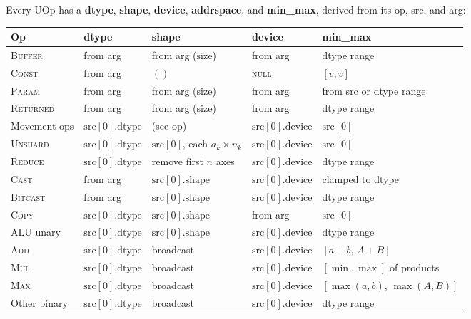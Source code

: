\documentclass[10pt,letterpaper]{article}
\newcommand{\op}[1]{\textsc{#1}}
\begin{document}
Every UOp has a \textbf{dtype}, \textbf{shape}, \textbf{device}, \textbf{addrspace}, and \textbf{min\_max}, derived from its op, src, and arg:

\medskip
\begin{tabular}{@{}l l l l l@{}}
\toprule
\textbf{Op} & \textbf{dtype} & \textbf{shape} & \textbf{device} & \textbf{min\_max} \\
\midrule
\op{Buffer} & from arg & from arg ($\mathrm{size}$) & from arg & dtype range \\
\op{Const} & from arg & $()$ & \textsc{null} & $[v, v]$ \\
\op{Param} & from arg & from arg ($\mathrm{size}$) & from arg & from src or dtype range \\
\op{Returned} & from arg & from arg ($\mathrm{size}$) & from arg & dtype range \\[3pt]
Movement ops & $\mathrm{src}[0].\mathrm{dtype}$ & (see op) & $\mathrm{src}[0].\mathrm{device}$ & $\mathrm{src}[0]$ \\
\op{Unshard} & $\mathrm{src}[0].\mathrm{dtype}$ & $\mathrm{src}[0]$, each $a_k \times n_k$ & $\mathrm{src}[0].\mathrm{device}$ & $\mathrm{src}[0]$ \\
\op{Reduce} & $\mathrm{src}[0].\mathrm{dtype}$ & remove first $n$ axes & $\mathrm{src}[0].\mathrm{device}$ & dtype range \\[3pt]
\op{Cast} & from arg & $\mathrm{src}[0].\mathrm{shape}$ & $\mathrm{src}[0].\mathrm{device}$ & clamped to dtype \\
\op{Bitcast} & from arg & $\mathrm{src}[0].\mathrm{shape}$ & $\mathrm{src}[0].\mathrm{device}$ & dtype range \\
\op{Copy} & $\mathrm{src}[0].\mathrm{dtype}$ & $\mathrm{src}[0].\mathrm{shape}$ & from arg & $\mathrm{src}[0]$ \\
ALU unary & $\mathrm{src}[0].\mathrm{dtype}$ & $\mathrm{src}[0].\mathrm{shape}$ & $\mathrm{src}[0].\mathrm{device}$ & dtype range \\
\op{Add} & $\mathrm{src}[0].\mathrm{dtype}$ & broadcast & $\mathrm{src}[0].\mathrm{device}$ & $[a+b,\, A+B]$ \\
\op{Mul} & $\mathrm{src}[0].\mathrm{dtype}$ & broadcast & $\mathrm{src}[0].\mathrm{device}$ & $[\min,\max]$ of products \\
\op{Max} & $\mathrm{src}[0].\mathrm{dtype}$ & broadcast & $\mathrm{src}[0].\mathrm{device}$ & $[\max(a,b),\, \max(A,B)]$ \\
Other binary & $\mathrm{src}[0].\mathrm{dtype}$ & broadcast & $\mathrm{src}[0].\mathrm{device}$ & dtype range \\

\end{tabular}
\end{document}

